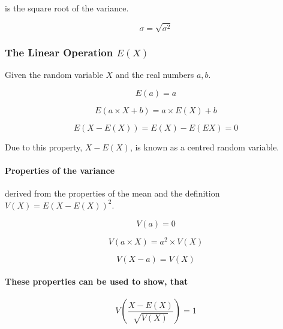 \documentclass[12pt]{article}
\begin{document}
	is the square root of the variance.
	
	\begin{equation*}
		\sigma = \sqrt{\sigma ^2}
	\end{equation*}
	
	\subsubsection{The Linear Operation \(E(X)\)}
	
	Given the random variable \(X\) and the real numbers \(a, b\).
	
	\begin{equation*}
		E(a)=a
	\end{equation*}
	
	\begin{equation*}
		E(a\times X + b) = a\times E(X) + b
	\end{equation*}
	
	\begin{equation*}
		E(X-E(X)) = E(X) - E(EX) = 0
	\end{equation*}
	
	\noindent Due to this property, \(X-E(X)\), is known as a centred random variable.
	
	\paragraph{Properties of the variance}
	
	derived from the properties of the mean and the definition \(V(X) = E(X-E(X))^2\).
	
	\begin{equation*}
		V(a)=0
	\end{equation*}
	
	\begin{equation*}
		V(a\times X)=a^2\times V(X)
	\end{equation*}
	
	\begin{equation*}
		V(X-a)=V(X)
	\end{equation*}
	
	\paragraph{These properties can be used to show, that}
	
	\begin{equation*}
		V\left( \frac{X-E(X)}{\sqrt{V(X)}}\right) =1
	\end{equation*}
	
\end{document}
